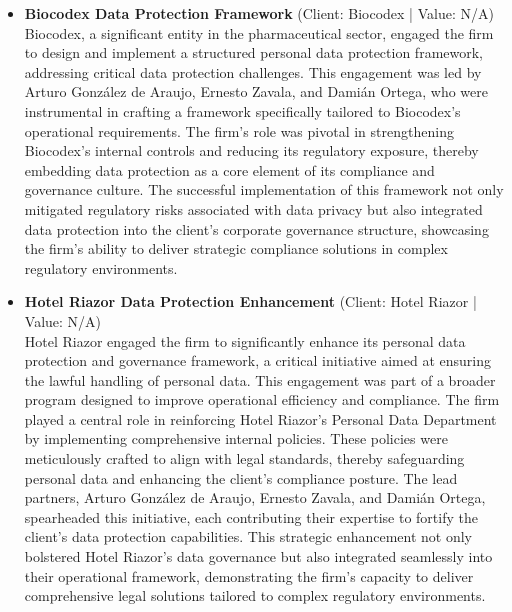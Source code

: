 \documentclass[11pt]{article}
\begin{document}
\begin{itemize}
This matter exemplifies the firm's adeptness in navigating complex regulatory environments and delivering strategic legal solutions that support both compliance and business continuity. The firm's representation of MEGA DIRECT highlights its capability to manage significant legal challenges in the data protection domain, thereby reinforcing the client's operational resilience and market standing.
\item \textbf{Biocodex Data Protection Framework} (Client: Biocodex | Value: N/A)\\ Biocodex, a significant entity in the pharmaceutical sector, engaged the firm to design and implement a structured personal data protection framework, addressing critical data protection challenges. This engagement was led by Arturo González de Araujo, Ernesto Zavala, and Damián Ortega, who were instrumental in crafting a framework specifically tailored to Biocodex's operational requirements. The firm's role was pivotal in strengthening Biocodex's internal controls and reducing its regulatory exposure, thereby embedding data protection as a core element of its compliance and governance culture. The successful implementation of this framework not only mitigated regulatory risks associated with data privacy but also integrated data protection into the client's corporate governance structure, showcasing the firm's ability to deliver strategic compliance solutions in complex regulatory environments.
\item \textbf{Hotel Riazor Data Protection Enhancement} (Client: Hotel Riazor | Value: N/A)\\ Hotel Riazor engaged the firm to significantly enhance its personal data protection and governance framework, a critical initiative aimed at ensuring the lawful handling of personal data. This engagement was part of a broader program designed to improve operational efficiency and compliance. The firm played a central role in reinforcing Hotel Riazor's Personal Data Department by implementing comprehensive internal policies. These policies were meticulously crafted to align with legal standards, thereby safeguarding personal data and enhancing the client's compliance posture. The lead partners, Arturo González de Araujo, Ernesto Zavala, and Damián Ortega, spearheaded this initiative, each contributing their expertise to fortify the client's data protection capabilities. This strategic enhancement not only bolstered Hotel Riazor's data governance but also integrated seamlessly into their operational framework, demonstrating the firm's capacity to deliver comprehensive legal solutions tailored to complex regulatory environments.

\end{itemize}
\end{document}
